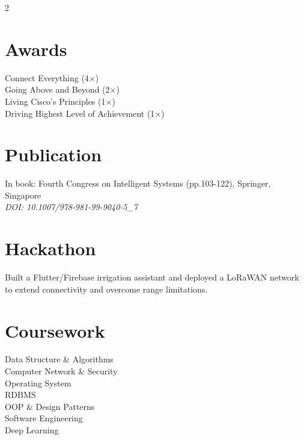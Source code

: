 \documentclass[]{hieudo-build}
\begin{document}
\begin{paracol}{2}
\section{Awards} 
Connect Everything (4$\times$) \\
Going Above and Beyond (2$\times$) \\
Living Cisco's Principles (1$\times$) \\
Driving Highest Level of Achievement (1$\times$) \\
\sectionsep

\newpage

\section{Publication}
In book: Fourth Congress on Intelligent Systems (pp.103-122), Springer, Singapore\\
\textit{DOI: 10.1007/978-981-99-9040-5\_7}
\sectionsep

\section{Hackathon}


\begin{tightemize}
\item Built a Flutter/Firebase irrigation assistant and deployed a LoRaWAN network to extend connectivity and overcome range limitations.
\end{tightemize}
\sectionsep

\section{Coursework}
Data Structure \& Algorithms \\
Computer Network \& Security \\
Operating System \\ 
RDBMS \\
OOP \& Design Patterns \\ 
Software Engineering \\ 
Deep Learning \\


\end{paracol}
\end{document}
